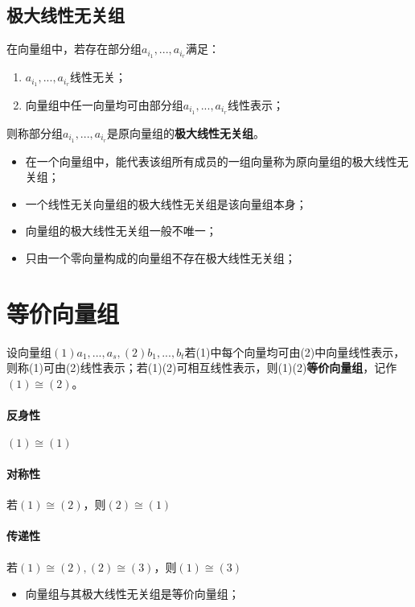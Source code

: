 \subsection{极大线性无关组}

在向量组中，若存在部分组\(a_{i_1},..., a_{i_r}\)满足：\begin{enumerate}
    \item \(a_{i_1},..., a_{i_r}\)线性无关；
    \item 向量组中任一向量均可由部分组\(a_{i_1},..., a_{i_r}\)线性表示；
\end{enumerate}
则称部分组\(a_{i_1},..., a_{i_r}\)是原向量组的\textbf{极大线性无关组}。
\begin{itemize}
    \item 在一个向量组中，能代表该组所有成员的一组向量称为原向量组的极大线性无关组；
    \item 一个线性无关向量组的极大线性无关组是该向量组本身；
    \item 向量组的极大线性无关组一般不唯一；
    \item 只由一个零向量构成的向量组不存在极大线性无关组；
\end{itemize}


\section{等价向量组}

设向量组\((1)a_1, ..., a_s, (2)b_1, ..., b_t\)若(1)中每个向量均可由(2)中向量线性表示，则称(1)可由(2)线性表示；若(1)(2)可相互线性表示，则(1)(2)\textbf{等价向量组}，记作\((1) \cong (2)\)。

\paragraph{反身性}
\((1) \cong (1)\)

\paragraph{对称性}
若\((1) \cong (2)\)，则\((2) \cong (1)\)

\paragraph{传递性}
若\((1) \cong (2), (2) \cong (3)\)，则\((1) \cong (3)\)

\begin{itemize}
    \item 向量组与其极大线性无关组是等价向量组；
\end{itemize}


